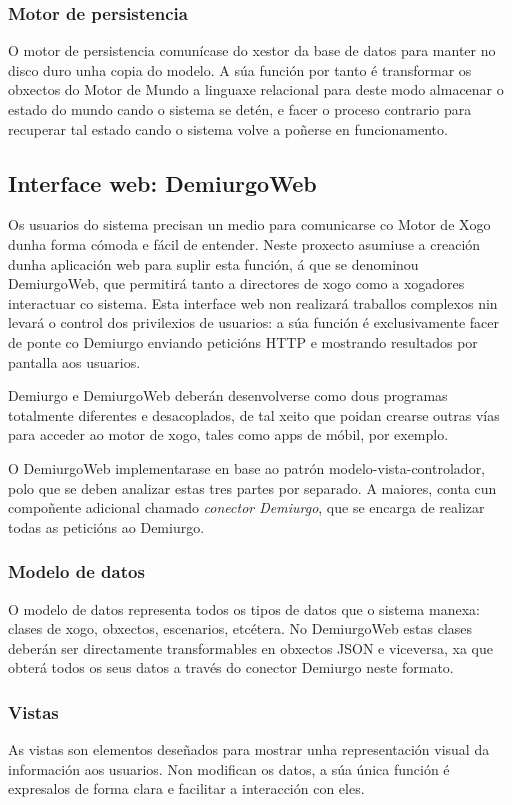 \subsubsection{Motor de persistencia}
O motor de persistencia comunícase do xestor da base de datos para manter no
disco duro unha copia do modelo. A súa función por tanto é transformar os
obxectos do Motor de Mundo a linguaxe relacional para deste modo almacenar o
estado do mundo cando o sistema se detén, e facer o proceso contrario para
recuperar tal estado cando o sistema volve a poñerse en funcionamento.

\subsection{Interface web: DemiurgoWeb}
Os usuarios do sistema precisan un medio para comunicarse co Motor de Xogo dunha
forma cómoda e fácil de entender. Neste proxecto asumiuse a creación dunha
aplicación web para suplir esta función, á que se denominou DemiurgoWeb, que
permitirá tanto a directores de xogo como a xogadores interactuar co sistema.
Esta interface web non realizará traballos complexos nin levará o control dos
privilexios de usuarios: a súa función é exclusivamente facer de ponte co
Demiurgo enviando peticións HTTP e mostrando resultados por pantalla aos
usuarios.
\par
Demiurgo e DemiurgoWeb deberán desenvolverse como dous programas totalmente
diferentes e desacoplados, de tal xeito que poidan crearse outras vías para
acceder ao motor de xogo, tales como apps de móbil, por exemplo.
\par
O DemiurgoWeb implementarase en base ao patrón modelo-vista-controlador, polo
que se deben analizar estas tres partes por separado. A maiores, conta cun
compoñente adicional chamado \textit{conector Demiurgo}, que se encarga
de realizar todas as peticións ao Demiurgo.

\subsubsection{Modelo de datos}
O modelo de datos representa todos os tipos de datos que o sistema manexa:
clases de xogo, obxectos, escenarios, etcétera. No DemiurgoWeb estas clases
deberán ser directamente transformables en obxectos JSON e viceversa, xa que
obterá todos os seus datos a través do conector Demiurgo neste formato.

\subsubsection{Vistas}
As vistas son elementos deseñados para mostrar unha representación visual da
información aos usuarios. Non modifican os datos, a súa única función é
expresalos de forma clara e facilitar a interacción con eles.

